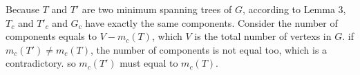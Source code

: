 Because $T$ and $T'$ are two minimum spanning trees of $G$, according to Lemma 3, $T_{c}$ and $T'_{c}$ and $G_{c}$ have exactly the same components. Consider the number of components equals to $V - m_c(T)$, which $V$ is the total number of vertexs in $G$. if $m_c(T') \neq m_c(T)$, the number of components is not equal too, which is a contradictory. so $m_c(T')$ must equal to $m_c(T)$.
 